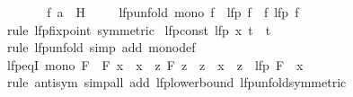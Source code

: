 \begin{isabellebody}
\isanewline
\ \ \ \ \isamarkupfalse%
\ \isamarkupfalse%
\ {\isachardoublequoteopen}f\ {\isacharquery}{\kern0pt}a\ {\isasymin}\ {\isacharquery}{\kern0pt}H{\isachardoublequoteclose}\ \isacommand{{\isachardot}{\kern0pt}{\isachardot}{\kern0pt}}\isamarkupfalse%
\isanewline
\ \ \isamarkupfalse%
\isanewline
{}\isamarkupfalse%
%
\endisatagproof
{\isafoldproof}%
%
\isadelimproof
\isanewline
%
\endisadelimproof
\isanewline
{}\isamarkupfalse%
\ lfp{\isacharunderscore}{\kern0pt}unfold{\isacharcolon}{\kern0pt}\ {\isachardoublequoteopen}mono\ f\ {\isasymLongrightarrow}\ lfp\ f\ {\isacharequal}{\kern0pt}\ f\ {\isacharparenleft}{\kern0pt}lfp\ f{\isacharparenright}{\kern0pt}{\isachardoublequoteclose}\isanewline
%
\isadelimproof
\ \ %
\endisadelimproof
%
\isatagproof
{}\isamarkupfalse%
\ {\isacharparenleft}{\kern0pt}rule\ lfp{\isacharunderscore}{\kern0pt}fixpoint\ {\isacharbrackleft}{\kern0pt}symmetric{\isacharbrackright}{\kern0pt}{\isacharparenright}{\kern0pt}%
\endisatagproof
{\isafoldproof}%
%
\isadelimproof
\isanewline
%
\endisadelimproof
\isanewline
{}\isamarkupfalse%
\ lfp{\isacharunderscore}{\kern0pt}const{\isacharcolon}{\kern0pt}\ {\isachardoublequoteopen}lfp\ {\isacharparenleft}{\kern0pt}{\isasymlambda}x{\isachardot}{\kern0pt}\ t{\isacharparenright}{\kern0pt}\ {\isacharequal}{\kern0pt}\ t{\isachardoublequoteclose}\isanewline
%
\isadelimproof
\ \ %
\endisadelimproof
%
\isatagproof
{}\isamarkupfalse%
\ {\isacharparenleft}{\kern0pt}rule\ lfp{\isacharunderscore}{\kern0pt}unfold{\isacharparenright}{\kern0pt}\ {\isacharparenleft}{\kern0pt}simp\ add{\isacharcolon}{\kern0pt}\ mono{\isacharunderscore}{\kern0pt}def{\isacharparenright}{\kern0pt}%
\endisatagproof
{\isafoldproof}%
%
\isadelimproof
\isanewline
%
\endisadelimproof
\isanewline
{}\isamarkupfalse%
\ lfp{\isacharunderscore}{\kern0pt}eqI{\isacharcolon}{\kern0pt}\ {\isachardoublequoteopen}mono\ F\ {\isasymLongrightarrow}\ F\ x\ {\isacharequal}{\kern0pt}\ x\ {\isasymLongrightarrow}\ {\isacharparenleft}{\kern0pt}{\isasymAnd}z{\isachardot}{\kern0pt}\ F\ z\ {\isacharequal}{\kern0pt}\ z\ {\isasymLongrightarrow}\ x\ {\isasymle}\ z{\isacharparenright}{\kern0pt}\ {\isasymLongrightarrow}\ lfp\ F\ {\isacharequal}{\kern0pt}\ x{\isachardoublequoteclose}\isanewline
%
\isadelimproof
\ \ %
\endisadelimproof
%
\isatagproof
{}\isamarkupfalse%
\ {\isacharparenleft}{\kern0pt}rule\ antisym{\isacharparenright}{\kern0pt}\ {\isacharparenleft}{\kern0pt}simp{\isacharunderscore}{\kern0pt}all\ add{\isacharcolon}{\kern0pt}\ lfp{\isacharunderscore}{\kern0pt}lowerbound\ lfp{\isacharunderscore}{\kern0pt}unfold{\isacharbrackleft}{\kern0pt}symmetric{\isacharbrackright}{\kern0pt}{\isacharparenright}{\kern0pt}%

\end{isabellebody}
